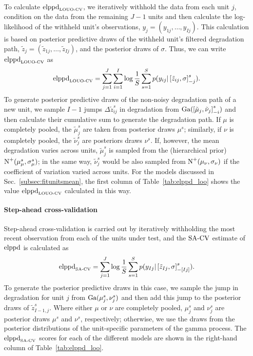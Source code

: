 \documentclass{article}
\begin{document}
To calculate $\hbox{elppd}_{\hbox{\tiny{LOUO-CV}}}$, we iteratively withhold the data from each unit $j$, condition on the data from the remaining $J-1$ units and then calculate the log-likelihood of the withheld unit's observations, $y_{j} = (y_{1j}, \ldots, y_{Ij})$. This calculation is based on posterior predictive draws of the withheld unit's filtered degradation path, $\tilde{z}_{j} = (\tilde{z}_{1j}, \ldots, \tilde{z}_{Ij})$, and the posterior draws of $\sigma$. Thus, we can write $\hbox{elppd}_{\hbox{\tiny{LOUO-CV}}}$ as
\begin{equation} \label{eq:elppd_louo}
   \hbox{elppd}_{\hbox{\tiny{LOUO-CV}}} = \sum^J_{j = 1}\sum^{I}_{i = 1} \log \frac{1}{S} \sum^S_{s = 1} p(y_{ij} | \left[\Tilde{z}_{ij}, \sigma \right]_{-j}^s).
\end{equation}
To generate posterior predictive draws of the non-noisy degradation path of a new unit, we sample $I-1$ jumps $\Delta\tilde{z}^s_{ij}$ in degradation from $\hbox{Ga}(\left[\tilde{\mu}_j, \tilde{\nu}_j\right]_{-i}^s)$ and then calculate their cumulative sum to generate the degradation path. If $\mu$ is completely pooled, the $\tilde{\mu}^s_j$ are taken from posterior draws $\mu^s$; similarly, if $\nu$ is completely pooled, the $\tilde{\nu}^s_j$ are posteriors draws $\nu^s$. If, however, the mean degradation varies across units, $\tilde{\mu}^s_j$ is sampled from the (hierarchical prior) $\hbox{N}^{+}(\mu^s_\mu, \sigma^s_\mu)$; in the same way, $\tilde{\nu}^s_j$ would be also sampled from $\hbox{N}^{+}(\mu_\nu, \sigma_\nu)$ if the coefficient of variation varied across units. For the models discussed in Sec.~\ref{subsec:fitunitsmean}, the first column of Table~\ref{tab:elppd_loo} shows the value $\hbox{elppd}_{\hbox{\tiny{LOUO-CV}}}$ calculated in this way.

\paragraph{Step-ahead cross-validation}

Step-ahead cross-validation is carried out by iteratively withholding the most recent observation from each of the units under test, and the $\hbox{SA-CV}$ estimate of $\hbox{elppd}$ is calculated as
\begin{equation} \label{eq:elppd_sa_cv}
   \hbox{elppd}_{\hbox{\tiny{SA-CV}}} = \sum^{J}_{j = 1} \log \frac{1}{S} \sum^S_{s = 1} p(y_{Ij} | \left[\tilde{z}_{Ij}, \sigma \right]_{-\left[ Ij \right]}^s).
\end{equation}
To generate the posterior predictive draws in this case, we sample the jump in degradation for unit $j$ from $\hbox{Ga}(\mu^s_j, \nu^s_j)$ and then add this jump to the posterior draws of $\tilde{z}^s_{I-1,j}$. Where either $\mu$ or $\nu$ are completely pooled, $\mu^s_j$ and $\nu^s_j$ are posterior draws $\mu^s$ and $\nu^s$, respectively; otherwise, we use the draws from the posterior distributions of the unit-specific parameters of the gamma process. The $\hbox{elppd}_{\hbox{\tiny{SA-CV}}}$ scores for each of the different models are shown in the right-hand column of Table~\ref{tab:elppd_loo}.
\end{document}
